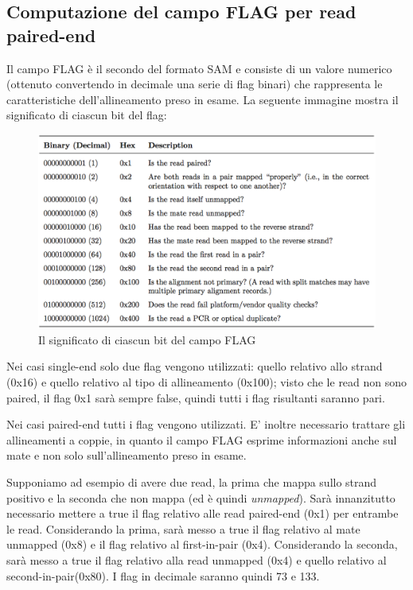 \newpage

\subsection{Computazione del campo FLAG per read paired-end}
Il campo FLAG è il secondo del formato SAM e consiste di un valore numerico (ottenuto convertendo in decimale una serie di flag binari) che rappresenta le caratteristiche dell'allineamento preso in esame. La seguente immagine mostra il significato di ciascun bit del flag:

\begin{figure}[h]
	\centering
	\includegraphics[width=\linewidth]{images/samflag.png}
  \caption{Il significato di ciascun bit del campo FLAG }
  \label{fig:SAM Flags}
\end{figure}

Nei casi single-end solo due flag vengono utilizzati: quello relativo allo strand (0x16) e quello relativo al tipo di allineamento (0x100); visto che le read non sono paired, il flag 0x1 sarà sempre false, quindi tutti i flag risultanti saranno pari.

Nei casi paired-end tutti i flag vengono utilizzati. E' inoltre necessario trattare gli allineamenti a coppie, in quanto il campo FLAG esprime informazioni anche sul mate e non solo sull'allineamento preso in esame. 

Supponiamo ad esempio di avere due read, la prima che mappa sullo strand positivo e la seconda che non mappa (ed è quindi \textit{unmapped}). Sarà innanzitutto necessario mettere a true il flag relativo alle read paired-end (0x1) per entrambe le read. Considerando la prima, sarà messo a true il flag relativo al mate unmapped (0x8) e il flag relativo al first-in-pair (0x4). Considerando la seconda, sarà messo a true il flag relativo alla read unmapped (0x4) e quello relativo al second-in-pair(0x80). I flag in decimale saranno quindi 73 e 133.

